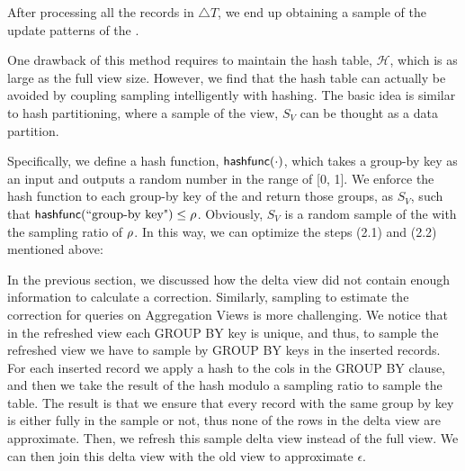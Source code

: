 After processing all the records in $\triangle T$, we end up obtaining a sample of the update patterns of the \aggview. 


One drawback of this method requires to maintain the hash table, $\mathcal{H}$, which is as large as the full view size. However, we find that the hash table can actually be avoided by coupling sampling intelligently with hashing. The basic idea is similar to hash partitioning, where a sample of the view, $S_{V}$ can be thought as a data partition. 

Specifically, we define a hash function, $\textsf{hashfunc}(\cdot)$, which takes a group-by key as an input and outputs a random number in the range of [0, 1]. We enforce the hash function to each group-by key of the \aggview and return those groups, as $S_{V}$, such that $\textsf{hashfunc}(\textrm{``group-by key"}) \leq \rho $. Obviously, $S_{V}$ is a random sample of the \aggview with the sampling ratio of $\rho $. In this way, we can optimize the steps (2.1) and (2.2) mentioned above:

{\noindent {}}


\fi






\iffalse
In the previous section, we discussed how the delta view did not contain enough
information to calculate a correction.
Similarly, sampling to estimate the correction for queries on Aggregation Views
is more challenging.
We notice that in the refreshed view each GROUP BY key is unique, and
thus, to sample the refreshed view we have to sample by GROUP BY keys
in the inserted records. For each inserted record we apply a hash
to the cols in the GROUP BY clause, and then we take the result of
the hash modulo a sampling ratio to sample the table. The result is
that we ensure that every record with the same group by key is either
fully in the sample or not, thus none of the rows in the delta view
are approximate. 
Then, we refresh this sample delta view instead of the full view.
We can then join this delta view with the old view to approximate $\epsilon$.

